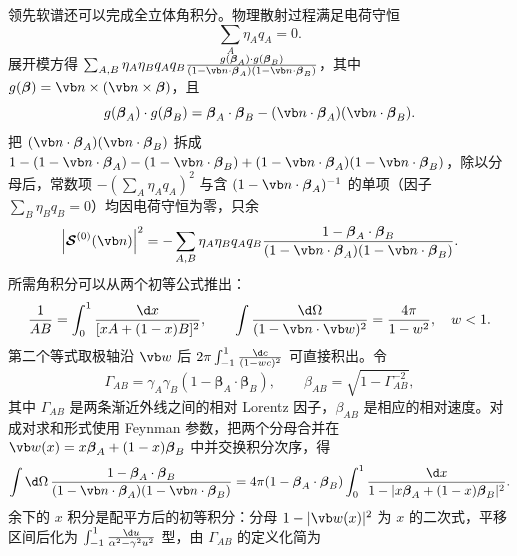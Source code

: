领先软谱还可以完成全立体角积分。物理散射过程满足电荷守恒
\begin{equation*}
	\sum_A\eta_Aq_A=0.
\end{equation*}
展开模方得 $\sum_{A,B}\eta_A\eta_Bq_Aq_B\frac{g(\boldsymbol\beta_A)\cdot g(\boldsymbol\beta_B)}{(1-\vb n\cdot\boldsymbol\beta_A)(1-\vb n\cdot\boldsymbol\beta_B)}$，其中 $g(\boldsymbol\beta)=\vb n\times(\vb n\times\boldsymbol\beta)$，且
\begin{equation*}
	g(\boldsymbol\beta_A)\cdot g(\boldsymbol\beta_B)
	=\boldsymbol\beta_A\cdot\boldsymbol\beta_B-(\vb n\cdot\boldsymbol\beta_A)(\vb n\cdot\boldsymbol\beta_B).
\end{equation*}
把 $(\vb n\cdot\boldsymbol\beta_A)(\vb n\cdot\boldsymbol\beta_B)$ 拆成 $1-(1-\vb n\cdot\boldsymbol\beta_A)-(1-\vb n\cdot\boldsymbol\beta_B)+(1-\vb n\cdot\boldsymbol\beta_A)(1-\vb n\cdot\boldsymbol\beta_B)$，除以分母后，常数项 $-(\sum_A\eta_Aq_A)^2$ 与含 $(1-\vb n\cdot\boldsymbol\beta_A)^{-1}$ 的单项（因子 $\sum_B\eta_Bq_B=0$）均因电荷守恒为零，只余
\begin{equation*}
	\left|\boldsymbol{\mathcal S}^{(0)}(\vb n)\right|^2
	=-
	\sum_{A,B}\eta_A\eta_Bq_Aq_B
	\frac{1-\boldsymbol\beta_A\cdot\boldsymbol\beta_B}
	{(1-\vb n\cdot\boldsymbol\beta_A)(1-\vb n\cdot\boldsymbol\beta_B)}.
\end{equation*}
所需角积分可以从两个初等公式推出：
\begin{equation*}
	\frac{1}{AB}=\int_0^1\frac{\d x}{[xA+(1-x)B]^2},
	\qquad
	\int\frac{\d\Omega}{(1-\vb n\cdot\vb w)^2}
	=\frac{4\pi}{1-w^2},
	\quad w<1.
\end{equation*}
第二个等式取极轴沿 $\vb w$ 后 $2\pi\int_{-1}^{1}\frac{\d c}{(1-wc)^2}$ 可直接积出。令
\begin{equation*}
	\Gamma_{AB}
	=\gamma_A\gamma_B
	\left(1-\boldsymbol\beta_A\cdot\boldsymbol\beta_B\right),
	\qquad
	\beta_{AB}=\sqrt{1-\Gamma_{AB}^{-2}},
\end{equation*}
其中 $\Gamma_{AB}$ 是两条渐近外线之间的相对 Lorentz 因子，$\beta_{AB}$ 是相应的相对速度。对成对求和形式使用 Feynman 参数，把两个分母合并在 $\vb w(x)=x\boldsymbol\beta_A+(1-x)\boldsymbol\beta_B$ 中并交换积分次序，得
\begin{equation*}
	\int\d\Omega\,
	\frac{1-\boldsymbol\beta_A\cdot\boldsymbol\beta_B}
	{(1-\vb n\cdot\boldsymbol\beta_A)(1-\vb n\cdot\boldsymbol\beta_B)}
	=4\pi
	(1-\boldsymbol\beta_A\cdot\boldsymbol\beta_B)
	\int_0^1\frac{\d x}
	{1-|x\boldsymbol\beta_A+(1-x)\boldsymbol\beta_B|^2}.
\end{equation*}
余下的 $x$ 积分是配平方后的初等积分：分母 $1-|\vb w(x)|^2$ 为 $x$ 的二次式，平移区间后化为 $\int_{-1}^{1}\frac{\d u}{\alpha^2-\gamma^2u^2}$ 型，由 $\Gamma_{AB}$ 的定义化简为
